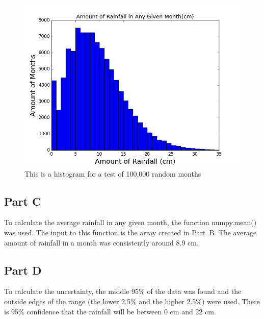 \documentclass[12pt]{article}
\begin{document}
	\begin{figure}[h]
	
		\centering
		\includegraphics[width=.9\textwidth]{Rain_Histogram.png}
		\caption{This is a histogram for a test of 100,000 random months \label{histo}}
	
	\end{figure}

\subsection{Part C}

	To calculate the average rainfall in any given month, the function numpy.mean() was
	used. The input to this function is the array created in Part~B. The average amount of 
	rainfall in a month was consistently around 8.9 cm.

\subsection{Part D}

	To calculate the uncertainty, the middle 95\% of the data was found and the outside
	edges of the range (the lower 2.5\% and the higher 2.5\%) were used. There is 95\%
	confidence that the rainfall will be between 0 cm and 22 cm.
\end{document}
